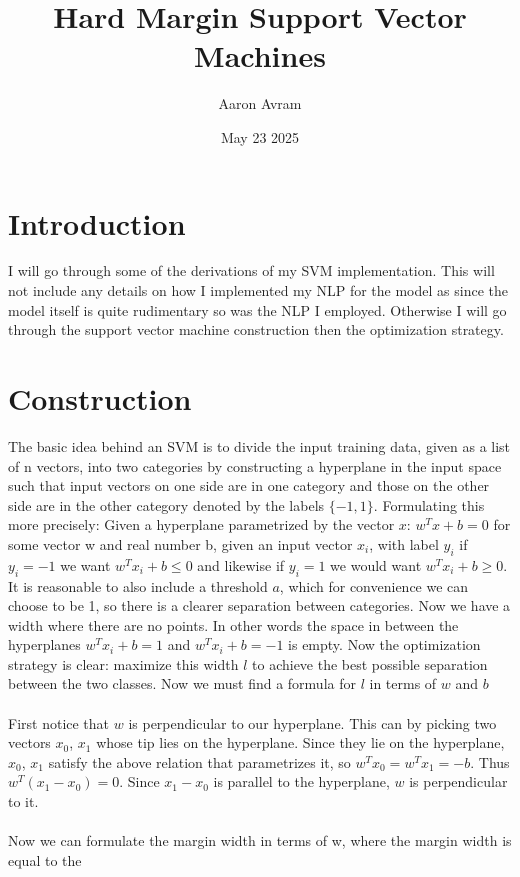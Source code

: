 \documentclass[12pt]{article}
\title{Hard Margin Support Vector Machines}
\author{Aaron Avram}
\date{May 23 2025}
\begin{document}
\maketitle

\section*{Introduction}
I will go through some of the derivations of my SVM implementation.
This will not include any details on how I implemented my NLP for the model
as since the model itself is quite rudimentary so was the NLP I employed.
Otherwise I will go through the support vector machine construction then
the optimization strategy.

\section*{Construction}
The basic idea behind an SVM is to divide the input training data, given as a list of n vectors,
into two categories by constructing a hyperplane in the input space such that
input vectors on one side are in one category and those on the other side are in
the other category denoted by the labels $\{-1, 1\}$. Formulating this more precisely: Given a hyperplane parametrized
by the vector $x$: $w^Tx + b = 0$ for some vector w and real number b, given an input
vector $x_i$, with label $y_i$ if $y_i = -1$ we want $w^Tx_i + b \leq 0$ and likewise if
$y_i = 1$ we would want $w^Tx_i + b \geq 0$. It is reasonable to also include a threshold $a$, which for convenience we can choose to be 1,
so there is a clearer separation between categories. Now we have a width where there are no points.
In other words the space in between the hyperplanes $w^Tx_i + b = 1$ and $w^Tx_i + b = -1$ is empty.
Now the optimization strategy is clear: maximize this width $l$ to achieve the best possible separation
between the two classes. Now we must find a formula for $l$ in terms of $w$ and $b$
\\ \\
First notice that $w$ is perpendicular to our hyperplane. This can by picking two vectors
$x_0$, $x_1$ whose tip lies on the hyperplane. Since they lie on the hyperplane, $x_0$, $x_1$
satisfy the above relation that parametrizes it, so $w^Tx_0 = w^Tx_1 = -b$. Thus $w^T(x_1 - x_0) = 0$.
Since $x_1 - x_0$ is parallel to the hyperplane, $w$ is perpendicular to it.
\\ \\
Now we can formulate the margin width in terms of w, where the margin width is equal to the 
\end{document}
